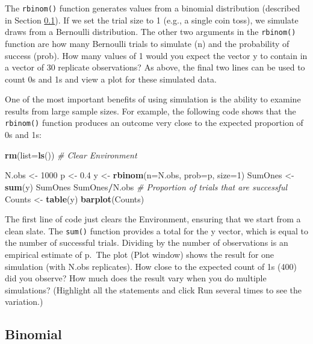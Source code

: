 \documentclass[
]{krantz}
\makeatletter
\newenvironment{Shaded}{\begin{snugshade}}{\end{snugshade}}
\newcommand{\AttributeTok}[1]{\textcolor[rgb]{0.27,0.27,0.27}{#1}}
\newcommand{\CommentTok}[1]{\textcolor[rgb]{0.37,0.37,0.37}{\textit{#1}}}
\newcommand{\DecValTok}[1]{\textcolor[rgb]{0.06,0.06,0.06}{#1}}
\newcommand{\FloatTok}[1]{\textcolor[rgb]{0.06,0.06,0.06}{#1}}
\newcommand{\FunctionTok}[1]{\textcolor[rgb]{0.27,0.27,0.27}{\textbf{#1}}}
\newcommand{\NormalTok}[1]{#1}
\newcommand{\OtherTok}[1]{\textcolor[rgb]{0.37,0.37,0.37}{#1}}
\newcommand{\SpecialCharTok}[1]{\textcolor[rgb]{0.43,0.43,0.43}{\textbf{#1}}}
\newenvironment{kframe}{%
\medskip{}
\setlength{\fboxsep}{.8em}
 \def\at@end@of@kframe{}%
 \ifinner\ifhmode%
  \def\at@end@of@kframe{\end{minipage}}%
  \begin{minipage}{\columnwidth}%
 \fi\fi%
 \def\FrameCommand##1{\hskip\@totalleftmargin \hskip-\fboxsep
 \colorbox{shadecolor}{##1}\hskip-\fboxsep
     \hskip-\linewidth \hskip-\@totalleftmargin \hskip\columnwidth}%
 \MakeFramed {\advance\hsize-\width
   \@totalleftmargin\z@ \linewidth\hsize
   \@setminipage}}%
 {\par\unskip\endMakeFramed%
 \at@end@of@kframe}
\renewenvironment{Shaded}{\begin{kframe}}{\end{kframe}}
\makeatother
\begin{document}
The \texttt{rbinom()} function generates values from a binomial distribution (described in Section \ref{BinomialDist}). If we set the trial size to 1 (e.g., a single coin toss), we simulate draws from a Bernoulli distribution. The other two arguments in the \texttt{rbinom()} function are how many Bernoulli trials to simulate (n) and the probability of success (prob). How many values of 1 would you expect the vector y to contain in a vector of 30 replicate observations? As above, the final two lines can be used to count 0s and 1s and view a plot for these simulated data.

One of the most important benefits of using simulation is the ability to examine results from large sample sizes. For example, the following code shows that the \texttt{rbinom()} function produces an outcome very close to the expected proportion of 0s and 1s:

\begin{Shaded}
\begin{Highlighting}[]
\FunctionTok{rm}\NormalTok{(}\AttributeTok{list=}\FunctionTok{ls}\NormalTok{()) }\CommentTok{\# Clear Environment}

\NormalTok{N.obs }\OtherTok{\textless{}{-}} \DecValTok{1000}
\NormalTok{p }\OtherTok{\textless{}{-}} \FloatTok{0.4}
\NormalTok{y }\OtherTok{\textless{}{-}} \FunctionTok{rbinom}\NormalTok{(}\AttributeTok{n=}\NormalTok{N.obs, }\AttributeTok{prob=}\NormalTok{p, }\AttributeTok{size=}\DecValTok{1}\NormalTok{)}
\NormalTok{SumOnes }\OtherTok{\textless{}{-}} \FunctionTok{sum}\NormalTok{(y)}
\NormalTok{SumOnes}
\NormalTok{SumOnes}\SpecialCharTok{/}\NormalTok{N.obs }\CommentTok{\# Proportion of trials that are successful}
\NormalTok{Counts }\OtherTok{\textless{}{-}} \FunctionTok{table}\NormalTok{(y)}
\FunctionTok{barplot}\NormalTok{(Counts)}
\end{Highlighting}
\end{Shaded}

The first line of code just clears the Environment, ensuring that we start from a clean slate. The \texttt{sum()} function provides a total for the y vector, which is equal to the number of successful trials. Dividing by the number of observations is an empirical estimate of p.~The plot (Plot window) shows the result for one simulation (with N.obs replicates). How close to the expected count of 1s (400) did you observe? How much does the result vary when you do multiple simulations? (Highlight all the statements and click Run several times to see the variation.)

\hypertarget{BinomialDist}{%
\subsection{Binomial}\label{BinomialDist}}
\end{document}
